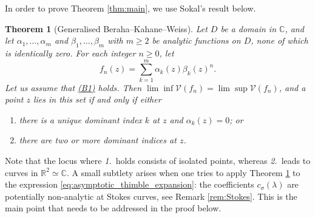 \documentclass[11pt, a4paper]{article}
\newtheorem{theorem}{Theorem}
\numberwithin{theorem}{section}
\theoremstyle{remark}
\newcommand{\RR}{\mathbb{R}}
\newcommand{\CC}{\mathbb{C}}
\newcommand{\V}{\mathcal{V}}
\theoremstyle{theorem}
\begin{document}
In order to prove Theorem \ref{thm:main}, we use Sokal's result \cite[Theorem 1.5]{sokal2004chromatic} below.

\begin{theorem}[Generalised Beraha--Kahane--Weiss]
  \label{thm:sokal}
  Let $D$ be a domain in $\CC$, and let $\alpha_1,\dots,\alpha_{m}$ and $\beta_1,\dots,\beta_{m}$ with $m\geq 2$ be \emph{analytic} functions on $D$, none of which is identically zero. For each integer $n\geq 0$, let 
  \[
    f_n(z) = \sum_{k=1}^{m} \alpha_k(z)\beta_k(z)^n.
  \]
  Let us assume that \hyperref[ass:B1]{(B1)} holds. Then $\lim\inf \V(f_n) = \lim\sup \V(f_n)$, and a point $z$ lies in this set if and only if either
  \begin{enumerate}
    \item there is a unique dominant index $k$ at $z$ and $\alpha_k(z) = 0$; or
    \item there are two or more dominant indices at $z$.
  \end{enumerate} 
\end{theorem}

Note that the locus where {\it 1.}~holds consists of isolated points, whereas {\it 2.}~leads to curves in $\RR^2\simeq \CC$. A small subtlety arises when one tries to apply Theorem \ref{thm:sokal} to the expression \eqref{eq:asymptotic_thimble_expansion}: the coefficients $c_\sigma(\lambda)$ are potentially non-analytic at Stokes curves, see Remark \ref{rem:Stokes}. This is the main point that needs to be addressed in the proof below.
\end{document}
